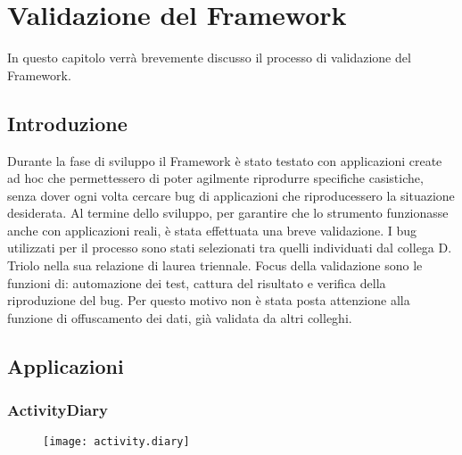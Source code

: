 \chapter{Validazione del Framework}
In questo capitolo verrà brevemente discusso il processo di validazione del Framework. 

\section{Introduzione}
Durante la fase di sviluppo il Framework è stato testato con applicazioni create ad hoc che permettessero di poter agilmente riprodurre specifiche casistiche, senza dover ogni volta cercare bug di applicazioni che riproducessero la situazione desiderata. Al termine dello sviluppo, per garantire che lo strumento funzionasse anche con applicazioni reali, è stata effettuata una breve validazione. I bug utilizzati per il processo sono stati selezionati tra quelli individuati dal collega D. Triolo nella sua relazione di laurea triennale. Focus della validazione sono le funzioni di: automazione dei test, cattura del  risultato e verifica della riproduzione del bug. Per questo motivo non è stata posta attenzione alla funzione di offuscamento dei dati, già validata da altri colleghi.
\newpage
\section{Applicazioni}
\subsection{ActivityDiary}
 \begin{figure}[H]
	\texttt{[image: activity.diary]}
	\centering
\end{figure}

